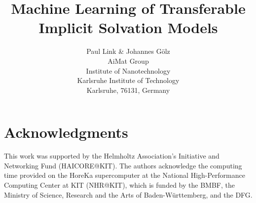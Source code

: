 \documentclass{article} %
\title{Machine Learning of Transferable Implicit Solvation Models}
\author{Paul Link \& Johannes Gölz \\
AiMat Group \\
Institute of Nanotechnology\\
Karlsruhe Institute of Technology\\
Karlsruhe, 76131, Germany \\
}
\begin{document}
\maketitle
















\section*{Acknowledgments}
This work was supported by the Helmholtz Association's Initiative and Networking Fund (HAICORE@KIT). The authors acknowledge the computing time provided on the HoreKa supercomputer at the National High-Performance Computing Center at KIT (NHR@KIT), which is funded by the BMBF, the Ministry of Science, Research and the Arts of Baden-Württemberg, and the DFG.




\appendix


\end{document}
